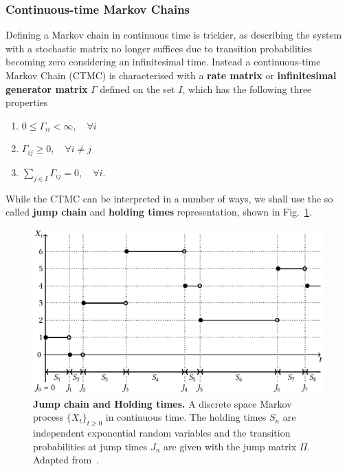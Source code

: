 \subsubsection{Continuous-time Markov Chains}
\label{subsubsect:CTMC}
Defining a Markov chain in continuous time is trickier, as describing the system with a stochastic matrix no longer suffices due to transition probabilities becoming zero considering an infinitesimal time. Instead a continuous-time Markov Chain (CTMC) is characterised with a \textbf{rate matrix} or \textbf{infinitesimal generator matrix} $\Gamma$ defined on the set $I$, which has the following three properties
\begin{enumerate}[label=\roman*)]
	\item $0 \leq \Gamma_{ii} <\infty, \quad \forall i$
	\item $\Gamma_{ij} \geq 0, \quad \forall i \neq j$
	\item $\sum_{j \in I} \Gamma_{i j}=0, \quad \forall i$.
\end{enumerate}
While the CTMC can be interpreted in a number of ways, we shall use the so called \textbf{jump chain} and \textbf{holding times} representation, shown in Fig.~\ref{fig:holdingJumping}. 
\begin{figure}[h]
	\centering
	\includegraphics[width=0.9\linewidth]{Chapter3/Figs/Vector/ctmc.pdf}
	\caption[Jump chain and Holding times]{\textbf{Jump chain and Holding times.} A discrete space Markov process $\{X_t\}_{t\geq 0}$ in continuous time. The holding times $S_n$ are independent exponential random variables and the transition probabilities at jump times $J_n$ are given with the jump matrix $\Pi$. Adapted from~\cite{norris1998markov}.}
	\label{fig:holdingJumping}
\end{figure}

